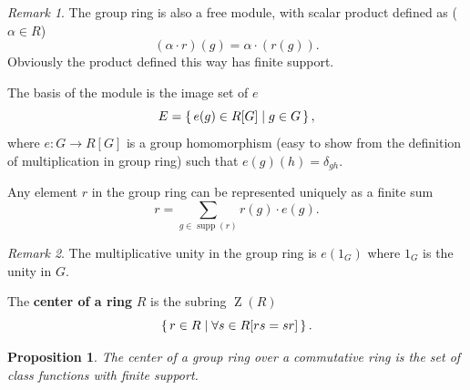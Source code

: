 \documentclass[12pt, letterpaper]{article}
\newcommand{\ZZ}{\operatorname{Z}}
\newcommand{\supp}{\operatorname{supp}}
\newtheorem{prop}{Proposition}[section]
\theoremstyle{definition}
\theoremstyle{remark}
\newtheorem*{rem*}{Remark}
\theoremstyle{definition}
\theoremstyle{plain}
\numberwithin{equation}{section}
\begin{document}
	\begin{rem*}
		The group ring is also a free module, with scalar product defined as ($\alpha \in R$)
		\[(\alpha \cdot r)(g)=\alpha \cdot (r(g)). \]
		Obviously the product defined this way has finite support.
		
		The basis of the module is the image set of $e$
		\[E=\set{e(g)\in R[G]|g\in G},\]
		where $e\colon G\to R[G]$ is a group homomorphism
		(easy to show from the definition of multiplication in group ring)
		such that $e(g)(h)=\delta_{gh}$.
		
		Any element $r$ in the group ring can be represented uniquely as a finite sum
		\[r = \sum_{g\in \supp(r)}r(g)\cdot e(g). \]
	\end{rem*}
	\begin{rem*}
		The multiplicative unity in the group ring is $e(1_G)$ where $1_G$ is the unity in $G$.
	\end{rem*}
	\begin{def*}
		The \textbf{center of a ring} $R$ is the subring $\ZZ(R)$
		\[\set{r\in R | \forall s\in R[rs=sr]}.\]
	\end{def*}
	\begin{prop}\label{propCenterGrpRing}
		The center of a group ring over a commutative ring is the set of class functions with finite support.
	\end{prop}
\end{document}
